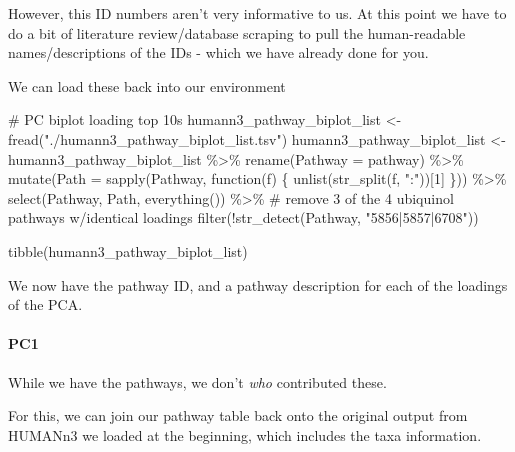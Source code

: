 \documentclass[
  letterpaper,
]{book}
\let\oldparagraph\paragraph
\renewcommand{\paragraph}[1]{\oldparagraph{#1}\mbox{}}
\newenvironment{Shaded}{}{}
\newcommand{\AttributeTok}[1]{\textcolor[rgb]{0.84,0.23,0.29}{#1}}
\newcommand{\CommentTok}[1]{\textcolor[rgb]{0.42,0.45,0.49}{#1}}
\newcommand{\ControlFlowTok}[1]{\textcolor[rgb]{0.84,0.23,0.29}{#1}}
\newcommand{\DecValTok}[1]{\textcolor[rgb]{0.00,0.36,0.77}{#1}}
\newcommand{\FunctionTok}[1]{\textcolor[rgb]{0.44,0.26,0.76}{#1}}
\newcommand{\NormalTok}[1]{\textcolor[rgb]{0.14,0.16,0.18}{#1}}
\newcommand{\OtherTok}[1]{\textcolor[rgb]{0.44,0.26,0.76}{#1}}
\newcommand{\SpecialCharTok}[1]{\textcolor[rgb]{0.00,0.36,0.77}{#1}}
\newcommand{\StringTok}[1]{\textcolor[rgb]{0.01,0.18,0.38}{#1}}
\begin{document}
However, this ID numbers aren't very informative to us. At this point we
have to do a bit of literature review/database scraping to pull the
human-readable names/descriptions of the IDs - which we have already
done for you.

We can load these back into our environment

\begin{Shaded}
\begin{Highlighting}[]
\CommentTok{\# PC biplot loading top 10s}
\NormalTok{humann3\_pathway\_biplot\_list }\OtherTok{\textless{}{-}} \FunctionTok{fread}\NormalTok{(}\StringTok{"./humann3\_pathway\_biplot\_list.tsv"}\NormalTok{)}
\NormalTok{humann3\_pathway\_biplot\_list }\OtherTok{\textless{}{-}}\NormalTok{ humann3\_pathway\_biplot\_list }\SpecialCharTok{\%\textgreater{}\%}
  \FunctionTok{rename}\NormalTok{(}\AttributeTok{Pathway =}\NormalTok{ pathway) }\SpecialCharTok{\%\textgreater{}\%}
  \FunctionTok{mutate}\NormalTok{(}\AttributeTok{Path =} \FunctionTok{sapply}\NormalTok{(Pathway, }\ControlFlowTok{function}\NormalTok{(f) \{}
                                  \FunctionTok{unlist}\NormalTok{(}\FunctionTok{str\_split}\NormalTok{(f, }\StringTok{":"}\NormalTok{))[}\DecValTok{1}\NormalTok{]}
\NormalTok{                                  \})) }\SpecialCharTok{\%\textgreater{}\%}
  \FunctionTok{select}\NormalTok{(Pathway, Path, }\FunctionTok{everything}\NormalTok{()) }\SpecialCharTok{\%\textgreater{}\%}
  \CommentTok{\# remove 3 of the 4 ubiquinol pathways w/identical loadings}
  \FunctionTok{filter}\NormalTok{(}\SpecialCharTok{!}\FunctionTok{str\_detect}\NormalTok{(Pathway, }\StringTok{"5856|5857|6708"}\NormalTok{))}

\FunctionTok{tibble}\NormalTok{(humann3\_pathway\_biplot\_list)}
\end{Highlighting}
\end{Shaded}

We now have the pathway ID, and a pathway description for each of the
loadings of the PCA.

\hypertarget{pc1}{%
\paragraph{PC1}\label{pc1}}

While we have the pathways, we don't \emph{who} contributed these.

For this, we can join our pathway table back onto the original output
from HUMANn3 we loaded at the beginning, which includes the taxa
information.
\end{document}
